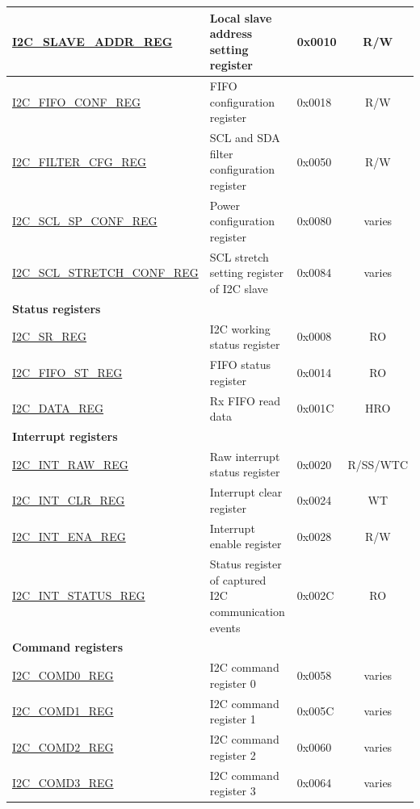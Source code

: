 \begin{longtable}{ | p{5.8cm} | p{6.8cm} | p{1.3cm} | c | }
\hyperref[regdesc:I2CSLAVEADDRREG]{I2C\_SLAVE\_ADDR\_REG} & Local slave address setting register & 0x0010 & R/W \\ \hline
\hyperref[regdesc:I2CFIFOCONFREG]{I2C\_FIFO\_CONF\_REG} & FIFO configuration register & 0x0018 & R/W \\ \hline
\hyperref[regdesc:I2CFILTERCFGREG]{I2C\_FILTER\_CFG\_REG} & SCL and SDA filter configuration register & 0x0050 & R/W \\ \hline
\hyperref[regdesc:I2CSCLSPCONFREG]{I2C\_SCL\_SP\_CONF\_REG} & Power configuration register & 0x0080 & varies \\ \hline
\hyperref[regdesc:I2CSCLSTRETCHCONFREG]{I2C\_SCL\_STRETCH\_CONF\_REG} & SCL stretch setting register of I2C slave & 0x0084 & varies \\ \hline
\multicolumn{4}{|l|}{\textbf{Status registers}} \\ \hline
\hyperref[regdesc:I2CSRREG]{I2C\_SR\_REG} & I2C working status register & 0x0008 & RO \\ \hline
\hyperref[regdesc:I2CFIFOSTREG]{I2C\_FIFO\_ST\_REG} & FIFO status register & 0x0014 & RO \\ \hline
\hyperref[regdesc:I2CDATAREG]{I2C\_DATA\_REG} & Rx FIFO read data & 0x001C & HRO \\ \hline
\multicolumn{4}{|l|}{\textbf{Interrupt registers}} \\ \hline
\hyperref[regdesc:I2CINTRAWREG]{I2C\_INT\_RAW\_REG} & Raw interrupt status register & 0x0020 & R/SS/WTC \\ \hline
\hyperref[regdesc:I2CINTCLRREG]{I2C\_INT\_CLR\_REG} & Interrupt clear register & 0x0024 & WT \\ \hline
\hyperref[regdesc:I2CINTENAREG]{I2C\_INT\_ENA\_REG} & Interrupt enable register & 0x0028 & R/W \\ \hline
\hyperref[regdesc:I2CINTSTATUSREG]{I2C\_INT\_STATUS\_REG} & Status register of captured I2C communication events & 0x002C & RO \\ \hline
\multicolumn{4}{|l|}{\textbf{Command registers}} \\ \hline
\hyperref[regdesc:I2CCOMD0REG]{I2C\_COMD0\_REG} & I2C command register 0 & 0x0058 & varies \\ \hline
\hyperref[regdesc:I2CCOMD1REG]{I2C\_COMD1\_REG} & I2C command register 1 & 0x005C & varies \\ \hline
\hyperref[regdesc:I2CCOMD2REG]{I2C\_COMD2\_REG} & I2C command register 2 & 0x0060 & varies \\ \hline
\hyperref[regdesc:I2CCOMD3REG]{I2C\_COMD3\_REG} & I2C command register 3 & 0x0064 & varies \\ \hline

\end{longtable}

